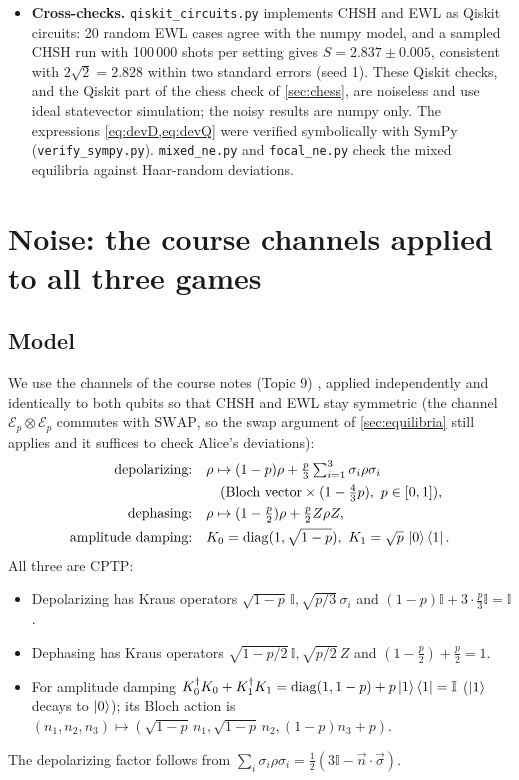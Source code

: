 \documentclass[11pt,a4paper]{article}
\begin{document}
\begin{itemize}
\item \textbf{Cross-checks.} \texttt{qiskit\_circuits.py} implements CHSH and EWL as Qiskit circuits: 20 random EWL cases agree with the numpy model, and a sampled CHSH run with 100\,000 shots per setting gives $S=2.837\pm0.005$, consistent with $2\sqrt2=2.828$ within two standard errors (seed 1). These Qiskit checks, and the Qiskit part of the chess check of \cref{sec:chess}, are noiseless and use ideal statevector simulation; the noisy results are numpy only. The expressions \cref{eq:devD,eq:devQ} were verified symbolically with SymPy (\texttt{verify\_sympy.py}). \texttt{mixed\_ne.py} and \texttt{focal\_ne.py} check the mixed equilibria against Haar-random deviations.
\end{itemize}

\section{Noise: the course channels applied to all three games}\label{sec:noise}

\subsection{Model}
We use the channels of the course notes (Topic 9) \cite{notes}, applied independently and identically to both qubits so that CHSH and EWL stay symmetric (the channel $\mathcal E_p\otimes\mathcal E_p$ commutes with $\mathrm{SWAP}$, so the swap argument of \cref{sec:equilibria} still applies and it suffices to check Alice's deviations):
\begin{align*}
\text{depolarizing:}&\quad \rho\mapsto(1-p)\rho+\tfrac p3\textstyle\sum_{i=1}^3\sigma_i\rho\sigma_i\\
&\qquad(\text{Bloch vector}\times(1-\tfrac43p),\ p\in[0,1]),\\
\text{dephasing:}&\quad \rho\mapsto(1-\tfrac p2)\rho+\tfrac p2 Z\rho Z,\\
\text{amplitude damping:}&\quad K_0=\mathrm{diag}(1,\sqrt{1-p}),\ K_1=\sqrt p\,\ket0\bra1.
\end{align*}
All three are CPTP:
\begin{itemize}
\item Depolarizing has Kraus operators $\sqrt{1-p}\,\mathbb I,\sqrt{p/3}\,\sigma_i$ and $(1-p)\mathbb I+3\cdot\frac p3\mathbb I=\mathbb I$.
\item Dephasing has Kraus operators $\sqrt{1-p/2}\,\mathbb I,\sqrt{p/2}\,Z$ and $(1-\frac p2)+\frac p2=1$.
\item For amplitude damping $K_0^\dagger K_0+K_1^\dagger K_1=\mathrm{diag}(1,1-p)+p\ket1\bra1=\mathbb I$ ($\ket1$ decays to $\ket0$); its Bloch action is $(n_1,n_2,n_3)\mapsto(\sqrt{1-p}\,n_1,\sqrt{1-p}\,n_2,(1-p)n_3+p)$.
\end{itemize}
The depolarizing factor follows from $\sum_i\sigma_i\rho\sigma_i=\tfrac12(3\mathbb I-\vec n\cdot\vec\sigma)$.
\end{document}
